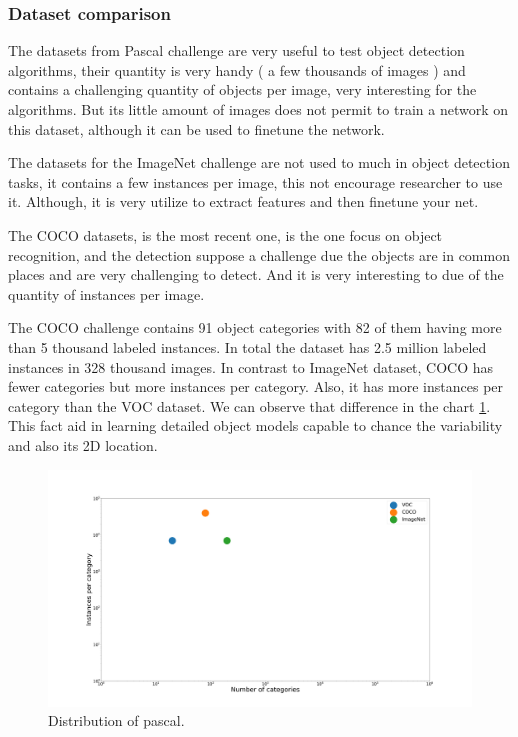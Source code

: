 \documentclass[12pt, a4paper, titlepage,twoside,openright]{article}
\begin{document}
\subsubsection{Dataset comparison}


The datasets from Pascal challenge are very useful to test object detection algorithms, their quantity is very handy ( a few thousands of images ) and contains a challenging quantity of objects per image, very interesting for the algorithms. But its little amount of images does not permit to train a network on this dataset, although it can be used to finetune the network.

The datasets for the ImageNet challenge are not used to much in object detection tasks, it contains a few instances per image, this not encourage researcher to use it. Although, it is very utilize to extract features and then finetune your net.


The COCO datasets, is the most recent one, is the one focus on object recognition, and the detection suppose a challenge due the objects are in common places and are very challenging to detect. And it is very interesting to due of the quantity of instances per image.


The COCO challenge contains 91 object categories with 82 of them having more than 5 thousand labeled instances. In total the dataset has 2.5 million labeled instances in 328 thousand images. In contrast to ImageNet dataset, COCO has fewer categories but more instances per category. Also, it has more instances per category than the VOC dataset. We can observe that difference in the chart \ref{instancesCategory}. This fact aid in learning detailed object models capable to chance the variability and also its 2D location.

\begin{figure}[H]
\centering         
\includegraphics[width=0.7\linewidth]{datasets/sdad2.png}
\caption{Distribution of pascal.} \label{instancesCategory}
\end{figure}
\end{document}
